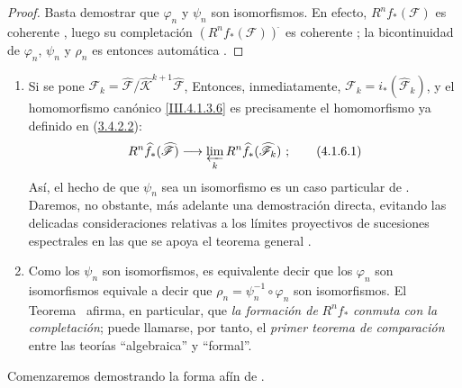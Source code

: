\begin{proof}
Basta demostrar que $\varphi_n$ y $\psi_n$ son isomorfismos.
En efecto, $R^nf_*(\mathcal F)$ es coherente , luego
su completación $(R^nf_*(\mathcal F))^{\widehat{\,}}$ es coherente
; la bicontinuidad de $\varphi_n$, $\psi_n$ y
$\rho_n$ es entonces automática .
\end{proof}

\begin{remarks}[4.1.6]
\label{III.4.1.6-fr}
\upshape
\begin{enumerate}
\item[(i)] Si se pone $\mathcal F_k=
\widehat{\mathcal F}/\widehat{\mathcal K}^{k+1}
\widehat{\mathcal F}$,
  Entonces, inmediatamente,
  $\mathcal F_k=i_*(\widehat{\mathcal F}_k)$,
  y el homomorfismo canónico \eqref{III.4.1.3.6} es precisamente el
  homomorfismo ya definido en (\hyperref[III.3.4.2.2]{3.4.2.2}):
  \[
R^n\widehat f_*(\widehat{\mathcal F})
\longrightarrow\varprojlim_kR^n\widehat f_*(\widehat{\mathcal F}_k)~;
\tag{4.1.6.1}\label{III.4.1.6.1-fr}
\]
  Así, el hecho de que $\psi_n$ sea un isomorfismo es un caso particular
  de .
  Daremos, no obstante, más adelante una demostración directa, evitando
  las delicadas consideraciones relativas a los límites proyectivos de
  sucesiones espectrales  en las que se apoya el teorema
  general .

  \item[(ii)] Como los $\psi_n$ son isomorfismos, es equivalente decir que los $\varphi_n$ son isomorfismos equivale a decir que
  $\rho_n=\psi_n^{-1}\circ\varphi_n$
  son isomorfismos.
  El Teorema~ afirma, en particular, que \emph{la formación de}
  $R^nf_*$ \emph{conmuta con la completación}; puede llamarse, por tanto, el
  \emph{primer teorema de comparación} entre las teorías ``algebraica'' y
  ``formal''.
\end{enumerate}
Comenzaremos demostrando la forma afín de .
\end{remarks}

